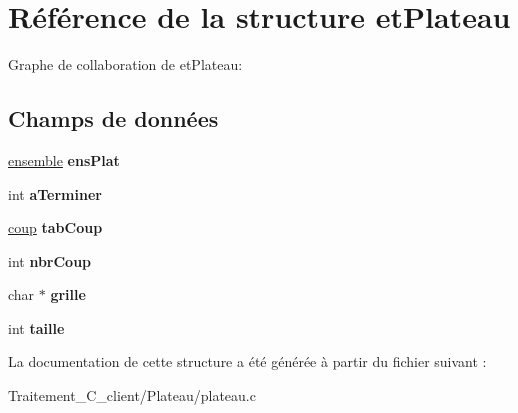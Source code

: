 \hypertarget{structet_plateau}{}\section{Référence de la structure et\+Plateau}
\label{structet_plateau}


Graphe de collaboration de et\+Plateau\+:
\subsection*{Champs de données}
\begin{DoxyCompactItemize}
\item 
\hyperlink{groupe_8h_a56928d429399ca3112579f4f3093898a}{ensemble} {\bfseries ens\+Plat}\hypertarget{structet_plateau_a1318aeb369239b199baa78aa5f647fce}{}\label{structet_plateau_a1318aeb369239b199baa78aa5f647fce}

\item 
int {\bfseries a\+Terminer}\hypertarget{structet_plateau_afc67d9fd17baff4c27c8c2e1c23580be}{}\label{structet_plateau_afc67d9fd17baff4c27c8c2e1c23580be}

\item 
\hyperlink{plateau_8h_a7613767b26f7cf7d36e3e013d65e519c}{coup} {\bfseries tab\+Coup}\hypertarget{structet_plateau_af59f332ec4bcc5f65982f621e1f7e141}{}\label{structet_plateau_af59f332ec4bcc5f65982f621e1f7e141}

\item 
int {\bfseries nbr\+Coup}\hypertarget{structet_plateau_a9b6e1ab1ce360bc32b16f5f43b8a1c5c}{}\label{structet_plateau_a9b6e1ab1ce360bc32b16f5f43b8a1c5c}

\item 
char $\ast$ {\bfseries grille}\hypertarget{structet_plateau_a8131c572ce92cb32ba5cf4979634adca}{}\label{structet_plateau_a8131c572ce92cb32ba5cf4979634adca}

\item 
int {\bfseries taille}\hypertarget{structet_plateau_a29bf3fc0ffe4e72e45f0c84ab4f8cd1e}{}\label{structet_plateau_a29bf3fc0ffe4e72e45f0c84ab4f8cd1e}

\end{DoxyCompactItemize}


La documentation de cette structure a été générée à partir du fichier suivant \+:\begin{DoxyCompactItemize}
\item 
Traitement\+\_\+\+C\+\_\+client/\+Plateau/plateau.\+c\end{DoxyCompactItemize}

